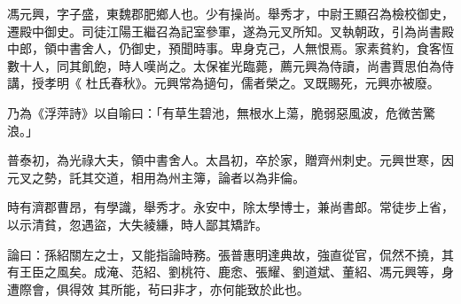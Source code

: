 \begin{pinyinscope}
 馮元興，字子盛，東魏郡肥鄉人也。少有操尚。舉秀才，中尉王顯召為檢校御史，遷殿中御史。司徒江陽王繼召為記室參軍，遂為元叉所知。叉執朝政，引為尚書殿中郎，領中書舍人，仍御史，預聞時事。卑身克己，人無恨焉。家素貧約，食客恆數十人，同其飢飽，時人嘆尚之。太保崔光臨薨，薦元興為侍讀，尚書賈思伯為侍講，授孝明《
 杜氏春秋》。元興常為擿句，儒者榮之。叉既賜死，元興亦被廢。



 乃為《浮萍詩》以自喻曰：「有草生碧池，無根水上蕩，脆弱惡風波，危微苦驚浪。」



 普泰初，為光祿大夫，領中書舍人。太昌初，卒於家，贈齊州刺史。元興世寒，因元叉之勢，託其交道，相用為州主簿，論者以為非倫。



 時有濟郡曹昂，有學識，舉秀才。永安中，除太學博士，兼尚書郎。常徒步上省，以示清貧，忽遇盜，大失綾縑，時人鄙其矯詐。



 論曰：孫紹關左之士，又能指論時務。張普惠明達典故，強直從官，侃然不撓，其有王臣之風矣。成淹、范紹、劉桃符、鹿悆、張耀、劉道斌、董紹、馮元興等，身遭際會，俱得效
 其所能，茍曰非才，亦何能致於此也。



\end{pinyinscope}
